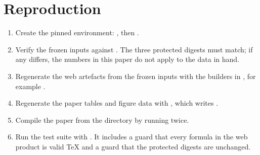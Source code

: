 \documentclass[11pt,a4paper]{article}
\begin{document}
\appendix
\section{Reproduction}\label{app:repro}
{\raggedright
\begin{enumerate}[leftmargin=1.6em,itemsep=3pt]
\item Create the pinned environment: , then
.
\item Verify the frozen inputs against . The
three protected digests must match; if any differs, the numbers in this paper do
not apply to the data in hand.
\item Regenerate the web artefacts from the frozen inputs with the builders in
, for example .
\item Regenerate the paper tables and figure data with
, which writes .
\item Compile the paper from the  directory by running
 twice.
\item Run the test suite with . It includes a
guard that every formula in the web product is valid \TeX{} and a guard that the
protected digests are unchanged.
\end{enumerate}
}
\par
\end{document}
